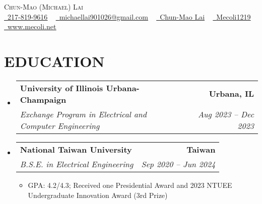 \documentclass[letterpaper,8pt]{article}
\makeatletter
\newcommand{\resumeItem}[1]{
  \item\small{
    {#1 \vspace{-2pt}}
  }
}
\newcommand{\resumeSubheading}[4]{
    \item
    \begin{tabular*}{1.0\textwidth}[t]{l@{\extracolsep{\fill}}r}
      \textbf{#1} & \textbf{\small #2} \\
      \textit{\small#3} & \textit{\small #4} \\
    \end{tabular*}\vspace{-7pt}
}
\newcommand{\resumeSubHeadingListStart}{\begin{itemize}[leftmargin=0.0in, label={}]}
\newcommand{\resumeSubHeadingListEnd}{\end{itemize}}
\newcommand{\resumeItemListStart}{\begin{itemize}}
\newcommand{\resumeItemListEnd}{\end{itemize}\vspace{-5pt}}
\makeatother
\begin{document}

\begin{center}
    {\huge \scshape Chun-Mao (Michael) Lai} \\ \vspace{3pt}
    \href{tel:217-819-9616}{\raisebox{-0.1\height}\faPhone\ \underline{217-819-9616}} ~ 
    \href{mailto:michaellai901026@gmail.com}{\raisebox{-0.1\height}\faEnvelope\  \underline{michaellai901026@gmail.com}} ~ 
    \href{https://www.linkedin.com/in/chun-mao-lai-aa1966229}{\raisebox{-0.1\height}\faLinkedin\ \underline{Chun-Mao Lai}}  ~
    \href{https://github.com/Mecoli1219}{\raisebox{-0.1\height}\faGithub\ \underline{Mecoli1219}} ~
    \href{https://www.mecoli.net}{\raisebox{-0.1\height}\faHome\ \underline{www.mecoli.net}}\\
    \vspace{-8pt}
\end{center}

\section{EDUCATION}
  \resumeSubHeadingListStart
    \resumeSubheading
      {University of Illinois Urbana-Champaign}{Urbana, IL}
      {Exchange Program in Electrical and Computer Engineering}{\textnormal{Aug 2023 -- Dec 2023}}
    \resumeSubheading
      {National Taiwan University}{Taiwan}
      {B.S.E. in Electrical Engineering}{\textnormal{Sep 2020 -- Jun 2024}}
      \resumeItemListStart
      \resumeItem{GPA: 4.2/4.3; Received one Presidential Award and 2023 NTUEE Undergraduate Innovation Award (3rd Prize)}
      \resumeItemListEnd
  \resumeSubHeadingListEnd
\vspace{-12pt}
\end{document}
